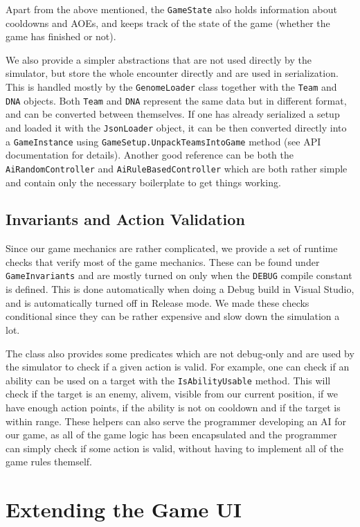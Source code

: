 Apart from the above mentioned, the \verb|GameState| also holds information about cooldowns and AOEs, and keeps track of the state of the game (whether the game has finished or not).

We also provide a simpler abstractions that are not used directly by the simulator, but store the whole encounter directly and are used in serialization. This is handled mostly by the \verb|GenomeLoader| class together with the \verb|Team| and \verb|DNA| objects. Both \verb|Team| and \verb|DNA| represent the same data but in different format, and can be converted between themselves. If one has already serialized a setup and loaded it with the \verb|JsonLoader| object, it can be then converted directly into a \verb|GameInstance| using \verb|GameSetup.UnpackTeamsIntoGame| method (see API documentation for details). Another good reference can be both the \verb|AiRandomController| and \verb|AiRuleBasedController| which are both rather simple and contain only the necessary boilerplate to get things working.

\subsection{Invariants and Action Validation}
\label{sec:invariants}

Since our game mechanics are rather complicated, we provide a set of runtime checks that verify most of the game mechanics. These can be found under \verb|GameInvariants| and are mostly turned on only when the \verb|DEBUG| compile constant is defined. This is done automatically when doing a Debug build in Visual Studio, and is automatically turned off in Release mode. We made these checks conditional since they can be rather expensive and slow down the simulation a lot.

The class also provides some predicates which are not debug-only and are used by the simulator to check if a given action is valid. For example, one can check if an ability can be used on a target with the \verb|IsAbilityUsable| method. This will check if the target is an enemy, alivem, visible from our current position, if we have enough action points, if the ability is not on cooldown and if the target is within range. These helpers can also serve the programmer developing an AI for our game, as all of the game logic has been encapsulated and the programmer can simply check if some action is valid, without having to implement all of the game rules themself.

\section{Extending the Game UI}

